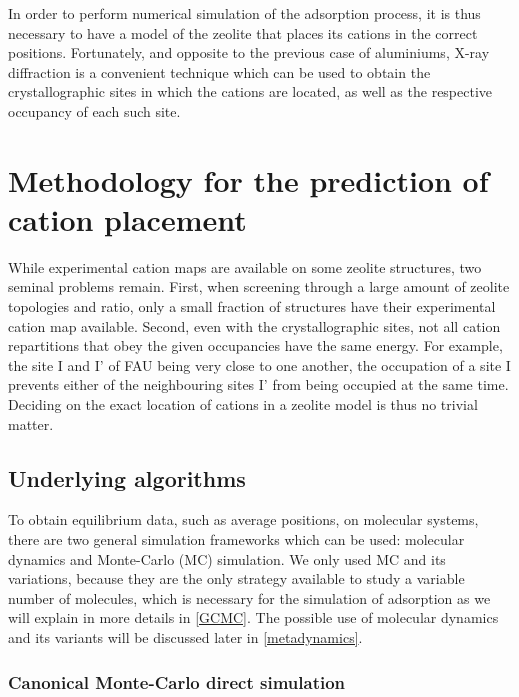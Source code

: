 \documentclass[main.tex]{subfiles}
\begin{document}
In order to perform numerical simulation of the adsorption process, it is thus necessary to have a model of the zeolite that places its cations in the correct positions. Fortunately, and opposite to the previous case of aluminiums, X-ray diffraction is a convenient technique which can be used to obtain the crystallographic sites in which the cations are located, as well as the respective occupancy of each such site.


\section{Methodology for the prediction of cation placement}

While experimental cation maps are available on some zeolite structures, two seminal problems remain. First, when screening through a large amount of zeolite topologies and \SiAl ratio, only a small fraction of structures have their experimental cation map available. Second, even with the crystallographic sites, not all cation repartitions that obey the given occupancies have the same energy. For example, the site I and I' of FAU being very close to one another, the occupation of a site I prevents either of the neighbouring sites I' from being occupied at the same time. Deciding on the exact location of cations in a zeolite model is thus no trivial matter.

\subsection{Underlying algorithms}

To obtain equilibrium data, such as average positions, on molecular systems, there are two general simulation frameworks which can be used: molecular dynamics and Monte-Carlo (MC) simulation. We only used MC and its variations, because they are the only strategy available to study a variable number of molecules, which is necessary for the simulation of adsorption as we will explain in more details in \cref{GCMC}. The possible use of molecular dynamics and its variants will be discussed later in \cref{metadynamics}.

\subsubsection{Canonical Monte-Carlo direct simulation}
\end{document}
